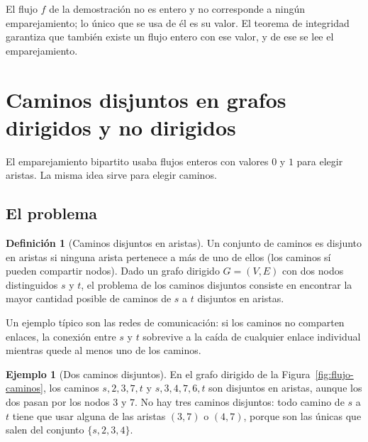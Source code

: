 \documentclass[12pt, spanish, oneside, openany]{book}
\theoremstyle{uprightplain}
\theoremstyle{definition}
\newtheorem{definicion}[teorema]{Definición}
\newtheorem{ejemplo}[teorema]{Ejemplo}
\theoremstyle{remark}
\theoremstyle{definition}
\begin{document}
El flujo $f$ de la demostración no es entero y no corresponde a ningún emparejamiento; lo único que se usa de él es su valor. El teorema de integridad garantiza que también existe un flujo entero con ese valor, y de ese se lee el emparejamiento.


\section{Caminos disjuntos en grafos dirigidos y no dirigidos}
\label{sec:flujo-caminos-disjuntos}

El emparejamiento bipartito usaba flujos enteros con valores $0$ y $1$ para elegir aristas. La misma idea sirve para elegir caminos.

\subsection{El problema}

\begin{definicion}[Caminos disjuntos en aristas]
\label{def:flujo-caminos-disjuntos}
Un conjunto de caminos es disjunto en aristas si ninguna arista pertenece a más de uno de ellos (los caminos sí pueden compartir nodos). Dado un grafo dirigido $G=(V,E)$ con dos nodos distinguidos $s$ y $t$, el problema de los caminos disjuntos consiste en encontrar la mayor cantidad posible de caminos de $s$ a $t$ disjuntos en aristas.
\end{definicion}

Un ejemplo típico son las redes de comunicación: si los caminos no comparten enlaces, la conexión entre $s$ y $t$ sobrevive a la caída de cualquier enlace individual mientras quede al menos uno de los caminos.

\begin{ejemplo}[Dos caminos disjuntos]
\label{ej:flujo-caminos}
En el grafo dirigido de la Figura~\ref{fig:flujo-caminos}, los caminos $s,2,3,7,t$ y $s,3,4,7,6,t$ son disjuntos en aristas, aunque los dos pasan por los nodos $3$ y $7$. No hay tres caminos disjuntos: todo camino de $s$ a $t$ tiene que usar alguna de las aristas $(3,7)$ o $(4,7)$, porque son las únicas que salen del conjunto $\{s,2,3,4\}$.
\end{ejemplo}
\end{document}
